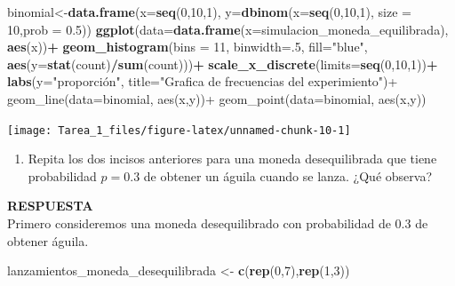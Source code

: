 \documentclass[11pt,]{article}
\newenvironment{Shaded}{\begin{snugshade}}{\end{snugshade}}
\newcommand{\DataTypeTok}[1]{\textcolor[rgb]{0.13,0.29,0.53}{#1}}
\newcommand{\DecValTok}[1]{\textcolor[rgb]{0.00,0.00,0.81}{#1}}
\newcommand{\FloatTok}[1]{\textcolor[rgb]{0.00,0.00,0.81}{#1}}
\newcommand{\KeywordTok}[1]{\textcolor[rgb]{0.13,0.29,0.53}{\textbf{#1}}}
\newcommand{\NormalTok}[1]{#1}
\newcommand{\OperatorTok}[1]{\textcolor[rgb]{0.81,0.36,0.00}{\textbf{#1}}}
\newcommand{\StringTok}[1]{\textcolor[rgb]{0.31,0.60,0.02}{#1}}
\providecommand{\tightlist}{%
  \setlength{\itemsep}{0pt}\setlength{\parskip}{0pt}}
\newcommand{\res}{\textbf{RESPUESTA}\\}
\begin{document}
\begin{Shaded}
\begin{Highlighting}[]
\NormalTok{binomial<-}\KeywordTok{data.frame}\NormalTok{(}\DataTypeTok{x=}\KeywordTok{seq}\NormalTok{(}\DecValTok{0}\NormalTok{,}\DecValTok{10}\NormalTok{,}\DecValTok{1}\NormalTok{), }\DataTypeTok{y=}\KeywordTok{dbinom}\NormalTok{(}\DataTypeTok{x=}\KeywordTok{seq}\NormalTok{(}\DecValTok{0}\NormalTok{,}\DecValTok{10}\NormalTok{,}\DecValTok{1}\NormalTok{), }\DataTypeTok{size =} \DecValTok{10}\NormalTok{,}\DataTypeTok{prob =} \FloatTok{0.5}\NormalTok{))}
\KeywordTok{ggplot}\NormalTok{(}\DataTypeTok{data=}\KeywordTok{data.frame}\NormalTok{(}\DataTypeTok{x=}\NormalTok{simulacion_moneda_equilibrada), }\KeywordTok{aes}\NormalTok{(x))}\OperatorTok{+}
\StringTok{  }\KeywordTok{geom_histogram}\NormalTok{(}\DataTypeTok{bins =} \DecValTok{11}\NormalTok{, }\DataTypeTok{binwidth=}\NormalTok{.}\DecValTok{5}\NormalTok{, }\DataTypeTok{fill=}\StringTok{"blue"}\NormalTok{, }\KeywordTok{aes}\NormalTok{(}\DataTypeTok{y=}\KeywordTok{stat}\NormalTok{(count)}\OperatorTok{/}\KeywordTok{sum}\NormalTok{(count)))}\OperatorTok{+}
\StringTok{  }\KeywordTok{scale_x_discrete}\NormalTok{(}\DataTypeTok{limits=}\KeywordTok{seq}\NormalTok{(}\DecValTok{0}\NormalTok{,}\DecValTok{10}\NormalTok{,}\DecValTok{1}\NormalTok{))}\OperatorTok{+}
\StringTok{  }\KeywordTok{labs}\NormalTok{(}\DataTypeTok{y=}\StringTok{"proporción", title="}\NormalTok{Grafica de frecuencias del experimiento}\StringTok{")+}
\StringTok{  geom_line(data=binomial, aes(x,y))+}
\StringTok{  geom_point(data=binomial, aes(x,y))}
\end{Highlighting}
\end{Shaded}

\begin{center}\texttt{[image: Tarea\_1\_files/figure-latex/unnamed-chunk-10-1]} \end{center}

\begin{enumerate}
\def\labelenumi{\alph{enumi}.}
\setcounter{enumi}{2}
\tightlist
\item
  Repita los dos incisos anteriores para una moneda desequilibrada que
  tiene probabilidad \(p = 0.3\) de obtener un águila cuando se lanza.
  ¿Qué observa?
\end{enumerate}

\res

Primero consideremos una moneda desequilibrado con probabilidad de 0.3
de obtener águila.

\begin{Shaded}
\begin{Highlighting}[]
\NormalTok{lanzamientos_moneda_desequilibrada <-}\StringTok{ }\KeywordTok{c}\NormalTok{(}\KeywordTok{rep}\NormalTok{(}\DecValTok{0}\NormalTok{,}\DecValTok{7}\NormalTok{),}\KeywordTok{rep}\NormalTok{(}\DecValTok{1}\NormalTok{,}\DecValTok{3}\NormalTok{))}
\end{Highlighting}
\end{Shaded}
\end{document}
